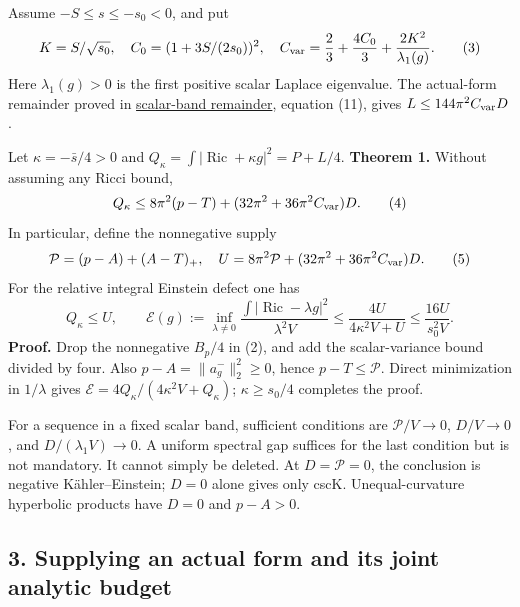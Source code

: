 \documentclass[
  11pt,
]{article}
\begin{document}
Assume \(-S\le s\le-s_0<0\), and put \[
 K=S/\sqrt{s_0},\quad C_0=(1+3S/(2s_0))^2,\quad
 C_{\rm var}=\frac23+\frac{4C_0}{3}+\frac{2K^2}{\lambda_1(g)}.
 \tag{3}
\] Here \(\lambda_1(g)>0\) is the first positive scalar Laplace
eigenvalue. The actual-form remainder proved in
\href{line1_scalar_band_remainder.md}{scalar-band remainder}, equation
(11), gives \(L\le144\pi^2C_{\rm var}D\).

Let \(\kappa=-\bar s/4>0\) and
\(Q_\kappa=\int|\operatorname{Ric}+\kappa g|^2=P+L/4\). \textbf{Theorem
1.} Without assuming any Ricci bound, \[
 Q_\kappa\le8\pi^2(p-T)+(32\pi^2+36\pi^2C_{\rm var})D.
 \tag{4}
\] In particular, define the nonnegative supply \[
 \mathcal P=(p-A)+(A-T)_+,\quad
 U=8\pi^2\mathcal P+(32\pi^2+36\pi^2C_{\rm var})D.
 \tag{5}
\] For the relative integral Einstein defect one has \[
 \boxed{Q_\kappa\le U,\qquad
 \mathcal E(g):=\inf_{\lambda\ne0}
 \frac{\int|\operatorname{Ric}-\lambda g|^2}{\lambda^2V}
 \le\frac{4U}{4\kappa^2V+U}\le\frac{16U}{s_0^2V}.}
 \tag{6}
\] \textbf{Proof.} Drop the nonnegative \(B_p/4\) in (2), and add the
scalar-variance bound divided by four. Also \(p-A=\|a_g^-\|_2^2\ge0\),
hence \(p-T\le\mathcal P\). Direct minimization in \(1/\lambda\) gives
\(\mathcal E=4Q_\kappa/(4\kappa^2V+Q_\kappa)\); \(\kappa\ge s_0/4\)
completes the proof.

For a sequence in a fixed scalar band, sufficient conditions are
\(\mathcal P/V\to0\), \(D/V\to0\), and \(D/(\lambda_1V)\to0\). A uniform
spectral gap suffices for the last condition but is not mandatory. It
cannot simply be deleted. At \(D=\mathcal P=0\), the conclusion is
negative Kähler--Einstein; \(D=0\) alone gives only cscK.
Unequal-curvature hyperbolic products have \(D=0\) and \(p-A>0\).

\hypertarget{supplying-an-actual-form-and-its-joint-analytic-budget}{%
\subsection{3. Supplying an actual form and its joint analytic
budget}\label{supplying-an-actual-form-and-its-joint-analytic-budget}}
\end{document}
